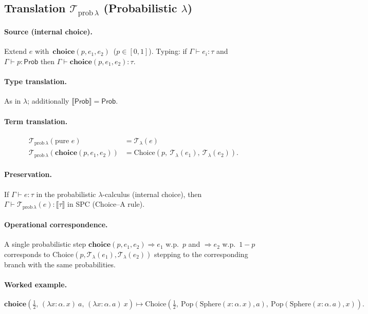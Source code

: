 \documentclass{article}
\begin{document}
\subsection{Translation $\mathcal{T}_{\mathrm{prob}\,\lambda}$ (Probabilistic $\lambda$)}

\paragraph{Source (internal choice).}
Extend $e$ with $\,\mathbf{choice}(p, e_1, e_2)\,$ ($p\in[0,1]$). Typing: if
$\Gamma\vdash e_i:\tau$ and $\Gamma\vdash p:\mathsf{Prob}$ then
$\Gamma\vdash \mathbf{choice}(p,e_1,e_2):\tau$.

\paragraph{Type translation.}
As in $\lambda$; additionally $\llbracket \mathsf{Prob} \rrbracket = \mathsf{Prob}$.

\paragraph{Term translation.}
\[
\begin{aligned}
\mathcal{T}_{\mathrm{prob}\,\lambda}(\text{pure } e)
  &= \mathcal{T}_\lambda(e) \\
\mathcal{T}_{\mathrm{prob}\,\lambda}(\mathbf{choice}(p,e_1,e_2))
  &= \mathrm{Choice}(p,\ \mathcal{T}_\lambda(e_1),\ \mathcal{T}_\lambda(e_2)).
\end{aligned}
\]

\paragraph{Preservation.}
If $\Gamma \vdash e : \tau$ in the probabilistic $\lambda$-calculus (internal choice),
then $\Gamma \vdash \mathcal{T}_{\mathrm{prob}\,\lambda}(e) : \llbracket \tau \rrbracket$ in SPC
(Choice--A rule).

\paragraph{Operational correspondence.}
A single probabilistic step
$\mathbf{choice}(p, e_1, e_2) \Rightarrow e_1$ w.p.\ $p$ and $\Rightarrow e_2$ w.p.\ $1-p$
corresponds to
$\mathrm{Choice}(p,\mathcal{T}_\lambda(e_1),\mathcal{T}_\lambda(e_2))$ stepping to the corresponding branch
with the same probabilities.

\paragraph{Worked example.}
\[
\mathbf{choice}\!\left(\tfrac12,\,(\lambda x{:}\alpha.\,x)\ a,\,(\lambda x{:}\alpha.\,a)\ x\right)
\mapsto
\mathrm{Choice}\!\left(\tfrac12,\ \mathrm{Pop}(\mathrm{Sphere}(x{:}\alpha.\,x), a),\ \mathrm{Pop}(\mathrm{Sphere}(x{:}\alpha.\,a), x)\right).
\]
\end{document}
